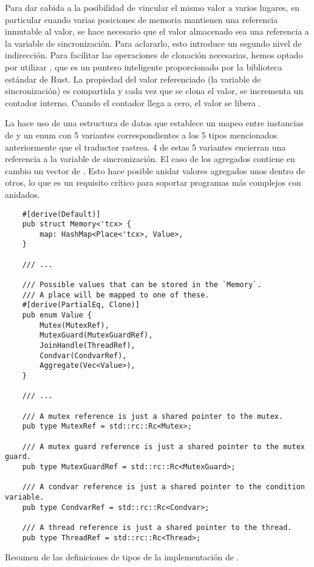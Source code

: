 Para dar cabida a la posibilidad de vincular el mismo valor a varios lugares, en particular
cuando varias posiciones de memoria mantienen una referencia inmutable al valor, se hace
necesario que el valor almacenado sea una referencia a la variable de sincronización. Para
aclararlo, esto introduce un segundo nivel de indirección. Para facilitar las operaciones de
clonación necesarias, hemos optado por utilizar , que es un puntero inteligente
proporcionado por la biblioteca estándar de Rust. La propiedad del valor referenciado (la
variable de sincronización) es compartida y cada vez que se clona el valor, se incrementa un
contador interno. Cuando el contador llega a cero, el valor se libera \cite[Chap. 15.4]{rust-book}.

La  hace uso de una estructura de datos  
que establece un mapeo entre instancias de 
y un enum con 5 variantes correspondientes a
los 5 tipos mencionados anteriormente que el traductor rastrea. 4 de estas 5 variantes
encierran una referencia  a la variable de sincronización. El caso de los agregados
contiene en cambio un vector de . Esto hace posible anidar valores agregados unos dentro de
otros, lo que es un requisito crítico para soportar programas más complejos con 
anidados.

\begin{listing}[!htb]
  \begin{verbatim}
    #[derive(Default)]
    pub struct Memory<'tcx> {
        map: HashMap<Place<'tcx>, Value>,
    }

    /// ...

    /// Possible values that can be stored in the `Memory`.
    /// A place will be mapped to one of these.
    #[derive(PartialEq, Clone)]
    pub enum Value {
        Mutex(MutexRef),
        MutexGuard(MutexGuardRef),
        JoinHandle(ThreadRef),
        Condvar(CondvarRef),
        Aggregate(Vec<Value>),
    }

    /// ...
    
    /// A mutex reference is just a shared pointer to the mutex.
    pub type MutexRef = std::rc::Rc<Mutex>;

    /// A mutex guard reference is just a shared pointer to the mutex guard.
    pub type MutexGuardRef = std::rc::Rc<MutexGuard>;

    /// A condvar reference is just a shared pointer to the condition variable.
    pub type CondvarRef = std::rc::Rc<Condvar>;

    /// A thread reference is just a shared pointer to the thread.
    pub type ThreadRef = std::rc::Rc<Thread>;
  \end{verbatim}
  \caption{Resumen de las definiciones de tipos de la implementación de .}
  \label{lst:memory-implementation}
\end{listing}

